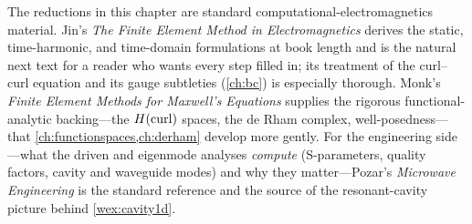\furtherreading
The reductions in this chapter are standard computational-electromagnetics
material. Jin's \emph{The Finite Element Method in Electromagnetics}
\citep{jin2014} derives the static, time-harmonic, and time-domain formulations
at book length and is the natural next text for a reader who wants every step
filled in; its treatment of the curl--curl equation and its gauge subtleties
(\cref{ch:bc}) is especially thorough. Monk's \emph{Finite Element Methods for
Maxwell's Equations} \citep{monk2003} supplies the rigorous functional-analytic
backing---the $H(\mathrm{curl})$ spaces, the de Rham complex, well-posedness---that
\cref{ch:functionspaces,ch:derham} develop more gently. For the engineering
side---what the driven and eigenmode analyses \emph{compute} (S-parameters,
quality factors, cavity and waveguide modes) and why they matter---Pozar's
\emph{Microwave Engineering} \citep{pozar2011} is the standard reference and the
source of the resonant-cavity picture behind \cref{wex:cavity1d}.

